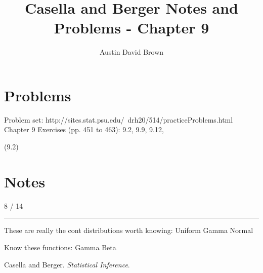 \documentclass[12pt, reqno]{amsart}
\numberwithin{equation}{section}
\begin{document}
\title{Casella and Berger Notes and Problems -  Chapter 9}
\author{Austin David Brown}
\maketitle

\section{Problems}

Problem set: http://sites.stat.psu.edu/~drh20/514/practiceProblems.html
Chapter 9 Exercises (pp. 451 to 463): 9.2, 9.9, 9.12,

(9.2)

\section{Notes}

8 / 14
\rule{\textwidth}{.5pt}

These are really the cont distributions worth knowing:
Uniform
Gamma
Normal

Know these functions:
Gamma
Beta


\begin{thebibliography}{1}

Casella and Berger. \textit{Statistical Inference}.
\end{thebibliography}
\end{document}
